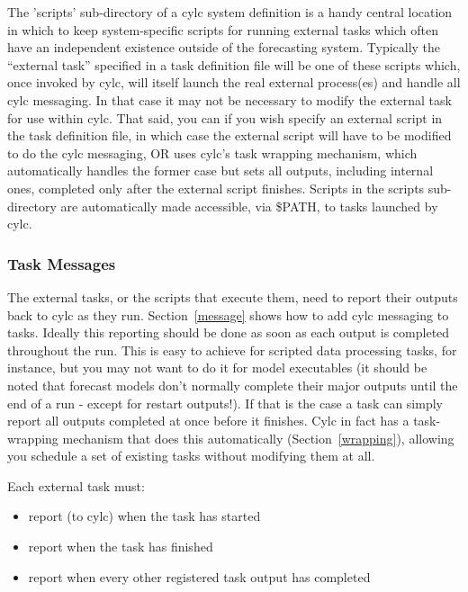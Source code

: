 \documentclass[11pt,a4paper]{article}
\begin{document}
The 'scripts' sub-directory of a cylc system definition is a handy
central location in which to keep system-specific scripts for running
external tasks which often have an independent existence outside of the
forecasting system. Typically the ``external task'' specified in a task
definition file will be one of these scripts which, once invoked by
cylc, will itself launch the real external process(es) and handle all
cylc messaging. In that case it may not be necessary to modify the
external task for use within cylc.  That said, you can if you wish
specify an external script in the task definition file, in which case 
the external script will have to be modified to do the cylc messaging,
OR uses cylc's task wrapping mechanism, which automatically handles the
former case but sets all outputs, including internal ones, completed
only after the external script finishes.  Scripts in the scripts
sub-directory are automatically made accessible, via \$PATH, to tasks
launched by cylc. 

\subsubsection{Task Messages}

The external tasks, or the scripts that execute them, need to report
their outputs back to cylc as they run. Section~\ref{message} shows
how to add cylc messaging to tasks.  Ideally this reporting should be
done as soon as each output is completed throughout the run. This is
easy to achieve for scripted data processing tasks, for instance, but
you may not want to do it for model executables (it should be noted that
forecast models don't normally complete their major outputs until the
end of a run - except for restart outputs!). If that is the case a task
can simply report all outputs completed at once before it finishes.
Cylc in fact has a task-wrapping mechanism that does this automatically
(Section~\ref{wrapping}), allowing you schedule a set of existing
tasks without modifying them at all.  

Each external task must:

\begin{itemize}
\item report (to cylc) when the task has started
\item report when the task has finished
\item report when every other registered task output has
completed
\end{itemize}
\end{document}
